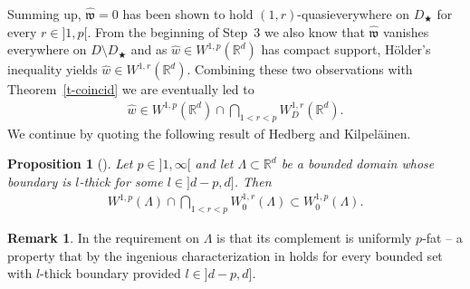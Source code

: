 \documentclass[10pt,leqno]{amsart}
\newtheorem{proposition}[theorem]{Proposition}
\theoremstyle{definition}
\newtheorem{remark}[theorem]{Remark}
\numberwithin{equation}{section}
\begin{document}
\noindent Summing up, $\widehat{{\mathfrak w}} = 0$ has been shown to hold
$(1,r)$-quasieverywhere on $D_\bigstar$ for every $r \in {]1,p[}$. From the
beginning of Step~3 we also know that $\widehat{{\mathfrak w}}$ vanishes everywhere on
$D \setminus D_\bigstar$ and as $\widehat{w} \in W^{1,p}({{\mathbb R}}^d)$ has compact
support, H\"older's inequality yields $\widehat{w} \in W^{1,r}({{\mathbb R}}^d)$. Combining
these two observations with Theorem~\ref{t-coincid} we are eventually led to
\begin{align}
\label{e-final observation converse hardy}
 \widehat{w} \in W^{1,p}({{\mathbb R}}^d) \cap \bigcap_{1<r<p} W_D^{1,r}({{\mathbb R}}^d).
\end{align}
We continue by quoting the following result of Hedberg and Kilpel\"ainen.

\begin{proposition}[{\cite[Cor.~3.5]{hedberg-stability}}]\label{p-stability}
Let $p \in {]1,\infty[}$ and let $\Lambda \subset {{\mathbb R}}^d$ be a bounded domain
whose boundary is $l$-thick for some $l \in {]d-p,d]}$. Then
\begin{align*}
 W^{1,p}(\Lambda) \cap \bigcap_{1<r<p} W_0^{1,r}(\Lambda) \subset
W_0^{1,p}(\Lambda).
\end{align*}
\end{proposition}

\begin{remark}\label{r-stability}
In \cite{hedberg-stability} the requirement on $\Lambda$ is that its complement
is uniformly $p$-fat -- a property that by the ingenious characterization in
\cite[Thm.~1]{juha} holds for every bounded set with $l$-thick boundary provided
$l \in {]d-p,d]}$. 
\end{remark}
\end{document}
